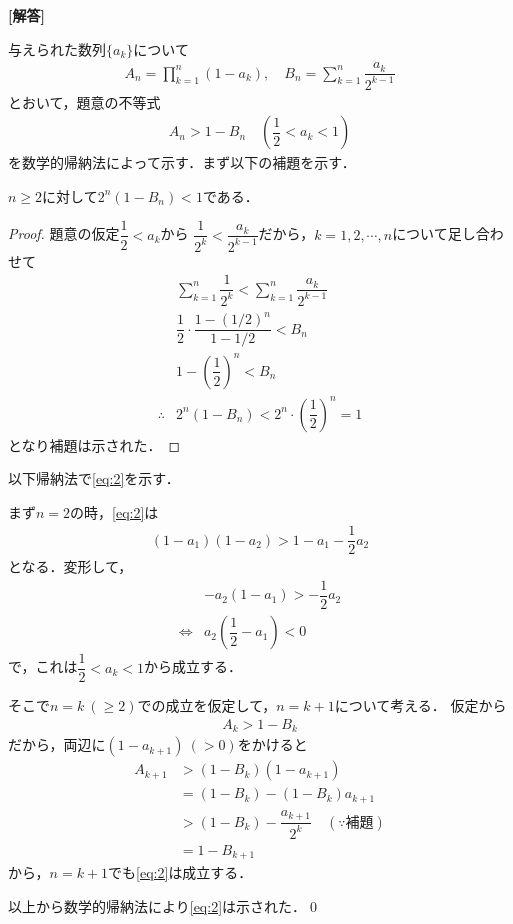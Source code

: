 \documentclass[../../main.tex]{subfiles}
\begin{document}
\begin{oframed}
  
\end{oframed}

{\bf [解答]}

与えられた数列$\{a_k\}$について
\begin{align}
  A_n=\displaystyle\prod_{k=1}^n(1-a_k), \quad
  B_n=\displaystyle\sum_{k=1}^n\dfrac{a_k}{2^{k-1}} \label{eq:1}
\end{align}
とおいて，題意の不等式
\begin{align}
  A_n > 1- B_n \quad \left(\dfrac{1}{2}<a_k<1\right) \label{eq:2}
\end{align}
を数学的帰納法によって示す．まず以下の補題を示す．

\begin{lemma}[補題]
  $n \ge 2$に対して$2^n(1-B_n)<1$である．
\end{lemma}

\begin{proof}
  題意の仮定$\dfrac{1}{2}<a_k$から $\dfrac{1}{2^k}<\dfrac{a_k}{2^{k-1}}$だから，$k=1,2,\cdots,n$について足し合わせて
  \begin{align}
    & \sum_{k=1}^{n}\dfrac{1}{2^k}<\sum_{k=1}^{n}\dfrac{a_k}{2^{k-1}} \\
    & \dfrac{1}{2}\cdot\dfrac{1-(1/2)^n}{1-1/2}<B_n \\
    & 1-\left(\dfrac{1}{2}\right)^n<B_n \\
    \therefore
    & 2^n(1-B_n)<2^n\cdot\left(\dfrac{1}{2}\right)^n=1
  \end{align}
  となり補題は示された．
\end{proof}

以下帰納法で\cref{eq:2}を示す．

まず$n=2$の時，\cref{eq:2}は
\begin{align}
  (1-a_1)(1-a_2)>1-a_1-\dfrac{1}{2}a_2
\end{align}
となる．変形して，
\begin{align}
  & -a_2(1-a_1)>-\dfrac{1}{2}a_2 \\
  \iff
  & a_2\left(\dfrac{1}{2}-a_1\right)<0
\end{align}
で，これは$\dfrac{1}{2}<a_k<1$から成立する．

そこで$n=k \ (\ge 2)$での成立を仮定して，$n=k+1$について考える．
仮定から
\begin{align}
  A_k>1-B_k
\end{align}
だから，両辺に$(1-a_{k+1})\ (>0)$をかけると
\begin{align}
  A_{k+1}
  &>(1-B_k)(1-a_{k+1})\\
  &=(1-B_k)-(1-B_k)a_{k+1}\\
  &>(1-B_k)-\dfrac{a_{k+1}}{2^k} \quad (\because\text{補題})\\
  &=1-B_{k+1}
\end{align}
から，$n=k+1$でも\cref{eq:2}は成立する．

以上から数学的帰納法により\cref{eq:2}は示された．\qed

\newpage
\end{document}

